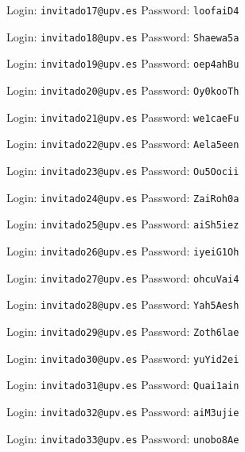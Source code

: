 \documentclass[12pt]{article}
\begin{document}
Login: \texttt{invitado17@upv.es} Password: \texttt{loofaiD4}
\vspace{2cm}

Login: \texttt{invitado18@upv.es} Password: \texttt{Shaewa5a}
\vspace{2cm}

Login: \texttt{invitado19@upv.es} Password: \texttt{oep4ahBu}
\vspace{2cm}

Login: \texttt{invitado20@upv.es} Password: \texttt{Oy0kooTh}
\vspace{2cm}

Login: \texttt{invitado21@upv.es} Password: \texttt{we1caeFu}
\vspace{2cm}

Login: \texttt{invitado22@upv.es} Password: \texttt{Aela5een}
\vspace{2cm}

Login: \texttt{invitado23@upv.es} Password: \texttt{Ou5Oocii}
\vspace{2cm}

Login: \texttt{invitado24@upv.es} Password: \texttt{ZaiRoh0a}
\vspace{2cm}

Login: \texttt{invitado25@upv.es} Password: \texttt{aiSh5iez}
\vspace{2cm}

Login: \texttt{invitado26@upv.es} Password: \texttt{iyeiG1Oh}
\vspace{2cm}

Login: \texttt{invitado27@upv.es} Password: \texttt{ohcuVai4}
\vspace{2cm}

Login: \texttt{invitado28@upv.es} Password: \texttt{Yah5Aesh}
\vspace{2cm}

Login: \texttt{invitado29@upv.es} Password: \texttt{Zoth6lae}
\vspace{2cm}

Login: \texttt{invitado30@upv.es} Password: \texttt{yuYid2ei}
\vspace{2cm}

Login: \texttt{invitado31@upv.es} Password: \texttt{Quai1ain}
\vspace{2cm}

Login: \texttt{invitado32@upv.es} Password: \texttt{aiM3ujie}
\vspace{2cm}

Login: \texttt{invitado33@upv.es} Password: \texttt{unobo8Ae}
\vspace{2cm}
\end{document}
